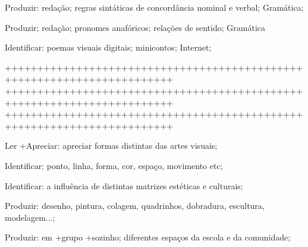  Produzir: redação; regras sintáticas de concordância nominal e verbal; Gramática;

 Produzir; redação; pronomes anafóricos; relações de sentido; Gramática

 Identificar: poemas visuais digitais; minicontos; Internet;


++++++++++++++++++++++++++++++++++++++++++++++++++++++++++++++++++++++++
++++++++++++++++++++++++++++++++++++++++++++++++++++++++++++++++++++++++
++++++++++++++++++++++++++++++++++++++++++++++++++++++++++++++++++++++++



 Ler +Apreciar: apreciar formas distintas das artes visuais;

 Identificar: ponto, linha, forma, cor, espaço, movimento etc;

 Identificar: a influência de distintas matrizes estéticas e culturais;

 Produzir: desenho, pintura, colagem, quadrinhos, dobradura, escultura, modelagem...; 

 Produzir: em +grupo +sozinho; diferentes espaços da escola e da comunidade;

